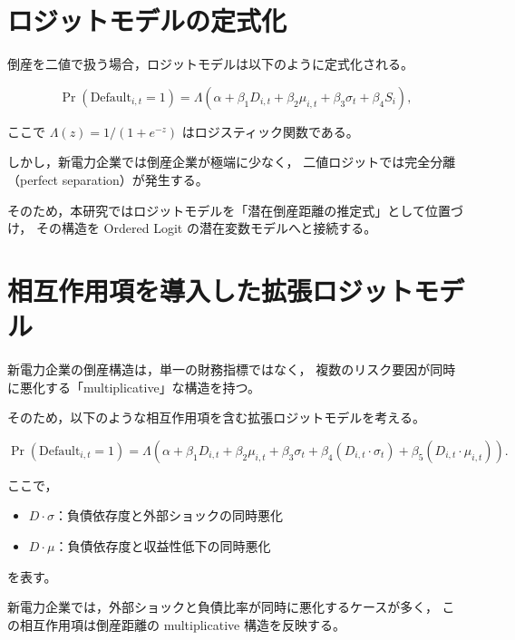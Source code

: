 \section{ロジットモデルの定式化}

倒産を二値で扱う場合，ロジットモデルは以下のように定式化される。



\[
\Pr(\text{Default}_{i,t}=1)
=
\Lambda(\alpha + \beta_1 D_{i,t} + \beta_2 \mu_{i,t} + \beta_3 \sigma_t + \beta_4 S_i),
\]



ここで $\Lambda(z)=1/(1+e^{-z})$ はロジスティック関数である。

しかし，新電力企業では倒産企業が極端に少なく，
二値ロジットでは完全分離（perfect separation）が発生する。

そのため，本研究ではロジットモデルを「潜在倒産距離の推定式」として位置づけ，
その構造を Ordered Logit の潜在変数モデルへと接続する。


\section{相互作用項を導入した拡張ロジットモデル}

新電力企業の倒産構造は，単一の財務指標ではなく，
複数のリスク要因が同時に悪化する「multiplicative」な構造を持つ。

そのため，以下のような相互作用項を含む拡張ロジットモデルを考える。



\[
\Pr(\text{Default}_{i,t}=1)
=
\Lambda(
\alpha
+ \beta_1 D_{i,t}
+ \beta_2 \mu_{i,t}
+ \beta_3 \sigma_t
+ \beta_4 (D_{i,t}\cdot\sigma_t)
+ \beta_5 (D_{i,t}\cdot\mu_{i,t})
).
\]



ここで，

\begin{itemize}
    \item $D \cdot \sigma$：負債依存度と外部ショックの同時悪化
    \item $D \cdot \mu$：負債依存度と収益性低下の同時悪化
\end{itemize}

を表す。

新電力企業では，外部ショックと負債比率が同時に悪化するケースが多く，
この相互作用項は倒産距離の multiplicative 構造を反映する。

